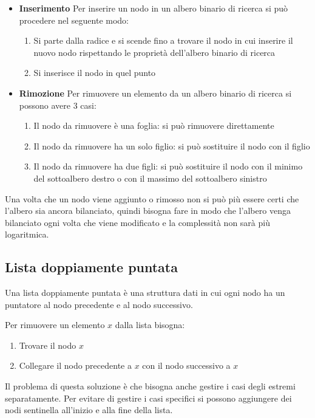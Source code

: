 \documentclass[a4paper]{article}
\begin{document}
\begin{itemize}
  \item \textbf{Inserimento}
    Per inserire un nodo in un albero binario di ricerca si può procedere nel seguente modo:
    \begin{enumerate}
      \item Si parte dalla radice e si scende fino a trovare il nodo in cui inserire il
        nuovo nodo rispettando le proprietà dell'albero binario di ricerca
      \item Si inserisce il nodo in quel punto
    \end{enumerate}

  \item \textbf{Rimozione}
    Per rimuovere un elemento da un albero binario di ricerca si possono avere 3 casi:
    \begin{enumerate}
      \item Il nodo da rimuovere è una foglia: si può rimuovere direttamente
      \item Il nodo da rimuovere ha un solo figlio: si può sostituire il nodo con il figlio
      \item Il nodo da rimuovere ha due figli: si può sostituire il nodo con il minimo
        del sottoalbero destro o con il massimo del sottoalbero sinistro
    \end{enumerate}
    
\end{itemize}
Una volta che un nodo viene aggiunto o rimosso non si può più essere certi che 
l'albero sia ancora bilanciato, quindi bisogna fare in modo che l'albero venga
bilanciato ogni volta che viene modificato e la complessità non sarà più logaritmica.

\subsection{Lista doppiamente puntata}
Una lista doppiamente puntata è una struttura dati in cui ogni nodo ha un puntatore
al nodo precedente e al nodo successivo.

\vspace{1em}
\noindent
Per rimuovere un elemento \( x \) dalla lista bisogna:
\begin{enumerate}
  \item Trovare il nodo \( x \)
  \item Collegare il nodo precedente a \( x \) con il nodo successivo a \( x \)
\end{enumerate}
Il problema di questa soluzione è che bisogna anche gestire i casi degli estremi
separatamente. Per evitare di gestire i casi specifici si possono aggiungere dei
nodi sentinella all'inizio e alla fine della lista.
\end{document}
